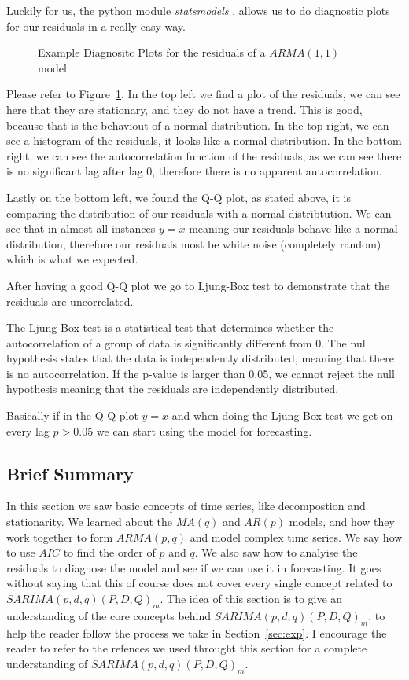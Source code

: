 \documentclass[journal]{IEEEtran}
\begin{document}
Luckily for us, the python module \emph{statsmodels} \cite{statsmodels},
allows us to do diagnostic plots for our residuals in a really easy way.

\begin{figure}[htbp]
  \centering
  
    \caption{Example Diagnositc Plots for the residuals of a $ARMA(1,1)$ model}
  \label{fig:diag-example}
\end{figure}

Please refer to Figure~\ref{fig:diag-example}. In the top left we find a plot
of the residuals, we can see here that they are stationary, and they do not
have a trend. This is good, because that is the behaviout of a normal
distribution. In the top right, we can see a histogram of the residuals, it
looks like a normal distribution. In the bottom right, we can see the
autocorrelation function of the residuals, as we can see there is no
significant lag after lag 0, therefore there is no apparent autocorrelation.

Lastly on the bottom left, we found the Q-Q plot, as stated above, it is
comparing the distribution of our residuals with a normal distribtution. We
can see that in almost all instances $y=x$ meaning our residuals behave like a
normal distribution, therefore our residuals most be white noise (completely
random) which is what we expected.

After having a good Q-Q plot we go to Ljung-Box test to demonstrate that the
residuals are uncorrelated.

The Ljung-Box test is a statistical test that determines whether the
autocorrelation of a group of data is significantly different from 0.
The null hypothesis states that the data is independently distributed,
meaning that there is no autocorrelation. If the p-value is larger than
0.05, we cannot reject the null hypothesis meaning that the residuals are
independently distributed. \cite{timeseries}

Basically if in the Q-Q plot $y = x$ and when doing the Ljung-Box  test we get
on every lag $p > 0.05$ we can start using the model for forecasting.

\subsection{Brief Summary}

In this section we saw basic concepts of time series,  like decompostion and
stationarity. We learned about the $MA(q)$ and $AR(p)$ models, and how they
work together to form $ARMA(p,q)$ and model complex time series. We say how to
use $AIC$ to find the order of $p$ and $q$. We also saw how to analyise the
residuals to diagnose the model and see if we can use it in forecasting. It
goes without saying that this of course does not cover every single concept
related to $SARIMA(p,d,q)(P,D,Q)_m$. The idea of this section is to give an
understanding of the core concepts behind $SARIMA(p,d,q)(P,D,Q)_m$, to help
the reader follow the process we take in Section~\ref{sec:exp}. I encourage
the reader to refer to the refences we used throught this section for a
complete understanding of $SARIMA(p,d,q)(P,D,Q)_m$.
\end{document}
